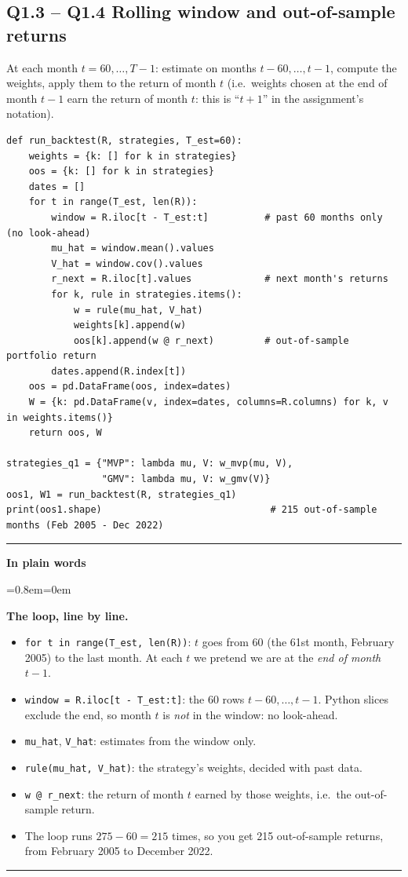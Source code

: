 \documentclass[11pt,a4paper]{report}
\newenvironment{notebox}[1]
  {\par\medskip\Needspace{6\baselineskip}\noindent\rule{\linewidth}{0.4pt}\par\nopagebreak
   \noindent\textbf{#1}\par\nopagebreak
   \begin{list}{}{\leftmargin=0.8em\rightmargin=0em\topsep=2pt}\item[]}
  {\end{list}\nopagebreak\noindent\rule{\linewidth}{0.4pt}\par\medskip}
\newenvironment{plainbox}{\begin{notebox}{In plain words}}{\end{notebox}}
\begin{document}
\subsection*{Q1.3 -- Q1.4 Rolling window and out-of-sample returns}
At each month $t=60,\dots,T-1$: estimate on months $t-60,\dots,t-1$, compute the
weights, apply them to the return of month $t$ (i.e.\ weights chosen at the end
of month $t-1$ earn the return of month $t$: this is ``$t+1$'' in the
assignment's notation).
\begin{lstlisting}
def run_backtest(R, strategies, T_est=60):
    weights = {k: [] for k in strategies}
    oos = {k: [] for k in strategies}
    dates = []
    for t in range(T_est, len(R)):
        window = R.iloc[t - T_est:t]          # past 60 months only (no look-ahead)
        mu_hat = window.mean().values
        V_hat = window.cov().values
        r_next = R.iloc[t].values             # next month's returns
        for k, rule in strategies.items():
            w = rule(mu_hat, V_hat)
            weights[k].append(w)
            oos[k].append(w @ r_next)         # out-of-sample portfolio return
        dates.append(R.index[t])
    oos = pd.DataFrame(oos, index=dates)
    W = {k: pd.DataFrame(v, index=dates, columns=R.columns) for k, v in weights.items()}
    return oos, W

strategies_q1 = {"MVP": lambda mu, V: w_mvp(mu, V),
                 "GMV": lambda mu, V: w_gmv(V)}
oos1, W1 = run_backtest(R, strategies_q1)
print(oos1.shape)                              # 215 out-of-sample months (Feb 2005 - Dec 2022)
\end{lstlisting}


\begin{plainbox}
\textbf{The loop, line by line.}
\begin{itemize}
  \item \texttt{for t in range(T\_est, len(R))}: $t$ goes from 60 (the 61st month,
    February 2005) to the last month. At each $t$ we pretend we are at the
    \emph{end of month $t-1$}.
  \item \texttt{window = R.iloc[t - T\_est:t]}: the 60 rows $t-60,\dots,t-1$.
    Python slices exclude the end, so month $t$ is \emph{not} in the window: no
    look-ahead.
  \item \texttt{mu\_hat}, \texttt{V\_hat}: estimates from the window only.
  \item \texttt{rule(mu\_hat, V\_hat)}: the strategy's weights, decided with past data.
  \item \texttt{w @ r\_next}: the return of month $t$ earned by those weights,
    i.e.\ the out-of-sample return.
  \item The loop runs $275-60=215$ times, so you get 215 out-of-sample returns,
    from February 2005 to December 2022.
\end{itemize}
\end{plainbox}
\end{document}
